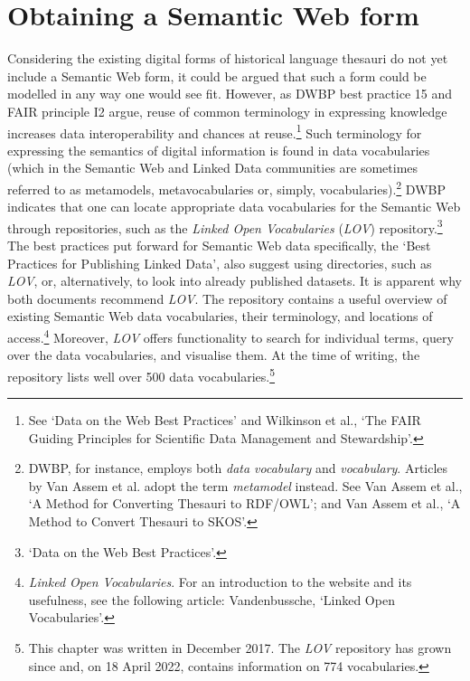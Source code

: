 \section{Obtaining a Semantic Web form}
\label{sect:Stolk_thes-digital-form:semweb-hlt}
Considering the existing digital forms of historical language thesauri do not yet include a Semantic Web form, it could be argued that such a form could be modelled in any way one would see fit. However, as DWBP best practice 15 and FAIR principle I2 argue, reuse of common terminology in expressing knowledge increases data interoperability and chances at reuse.\footnote{See `Data on the Web Best Practices' and Wilkinson et al., `The FAIR Guiding Principles for Scientific Data Management and Stewardship'.} Such terminology for expressing the semantics of digital information is found in data vocabularies (which in the Semantic Web and Linked Data communities are sometimes referred to as metamodels, metavocabularies or, simply, vocabularies).\footnote{DWBP, for instance, employs both \textit{data vocabulary} and \textit{vocabulary}. Articles by Van Assem et al. adopt the term \textit{metamodel} instead. See Van Assem et al., `A Method for Converting Thesauri to RDF/OWL'; and Van Assem et al., `A Method to Convert Thesauri to SKOS'.} %
DWBP indicates that one can locate appropriate data vocabularies for the Semantic Web through repositories, such as the \textit{Linked Open Vocabularies} (\textit{LOV}) repository.\footnote{`Data on the Web Best Practices'.} The best practices put forward for Semantic Web data specifically, the `Best Practices for Publishing Linked Data', also suggest using directories, such as \textit{LOV}, or, alternatively, to look into already published datasets. %
It is apparent why both documents recommend \textit{LOV}. The repository contains a useful overview of existing Semantic Web data vocabularies, their terminology, and locations of access.\footnote{\textit{Linked Open Vocabularies}. %
For an introduction to the website and its usefulness, see the following article: Vandenbussche, `Linked Open Vocabularies'.}  %
Moreover, \textit{LOV} offers functionality to search for individual terms, query over the data vocabularies, and visualise them. At the time of writing, the repository lists well over 500 data vocabularies.\footnote{This chapter was written in December 2017. The \textit{LOV} repository has grown since and, on 18 April 2022, contains information on 774 vocabularies.} %
